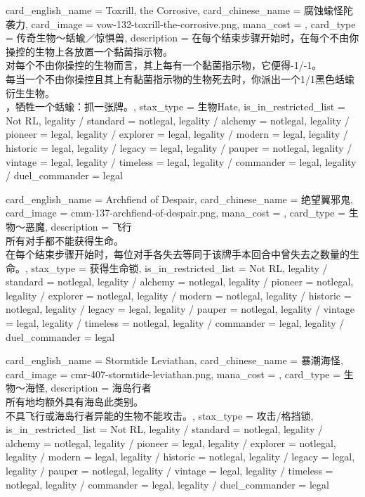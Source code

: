 \documentclass[lang = cn, color = black, 10pt]{AllThatStax}
\begin{document}
\card
{
	card_english_name = {Toxrill, the Corrosive},
	card_chinese_name = {腐蚀蝓怪陀袭力},
	card_image = vow-132-toxrill-the-corrosive.png,
	mana_cost = ,
	card_type = 传奇生物～蛞蝓／惊惧兽,
	description = {在每个结束步骤开始时，在每个不由你操控的生物上各放置一个黏菌指示物。\\
对每个不由你操控的生物而言，其上每有一个黏菌指示物，它便得-1/-1。\\
每当一个不由你操控且其上有黏菌指示物的生物死去时，你派出一个1/1黑色蛞蝓衍生生物。\\
，牺牲一个蛞蝓：抓一张牌。},
	stax_type = 生物Hate,
	is_in_restricted_list = Not RL,
	legality / standard = notlegal,
	legality / alchemy = notlegal,
	legality / pioneer = legal,
	legality / explorer = legal,
	legality / modern = legal,
	legality / historic = legal,
	legality / legacy = legal,
	legality / pauper = notlegal,
	legality / vintage = legal,
	legality / timeless = legal,
	legality / commander = legal,
	legality / duel_commander = legal
}

\card
{
	card_english_name = {Archfiend of Despair},
	card_chinese_name = {绝望翼邪鬼},
	card_image = cmm-137-archfiend-of-despair.png,
	mana_cost = ,
	card_type = 生物～恶魔,
	description = {飞行\\
所有对手都不能获得生命。\\
在每个结束步骤开始时，每位对手各失去等同于该牌手本回合中曾失去之数量的生命。},
	stax_type = 获得生命锁,
	is_in_restricted_list = Not RL,
	legality / standard = notlegal,
	legality / alchemy = notlegal,
	legality / pioneer = notlegal,
	legality / explorer = notlegal,
	legality / modern = notlegal,
	legality / historic = notlegal,
	legality / legacy = legal,
	legality / pauper = notlegal,
	legality / vintage = legal,
	legality / timeless = notlegal,
	legality / commander = legal,
	legality / duel_commander = legal
}

\card
{
	card_english_name = {Stormtide Leviathan},
	card_chinese_name = {暴潮海怪},
	card_image = cmr-407-stormtide-leviathan.png,
	mana_cost = ,
	card_type = 生物～海怪,
	description = {海岛行者\\
所有地均额外具有海岛此类别。\\
不具飞行或海岛行者异能的生物不能攻击。},
	stax_type = 攻击/格挡锁,
	is_in_restricted_list = Not RL,
	legality / standard = notlegal,
	legality / alchemy = notlegal,
	legality / pioneer = legal,
	legality / explorer = notlegal,
	legality / modern = legal,
	legality / historic = notlegal,
	legality / legacy = legal,
	legality / pauper = notlegal,
	legality / vintage = legal,
	legality / timeless = notlegal,
	legality / commander = legal,
	legality / duel_commander = legal
}
\end{document}
